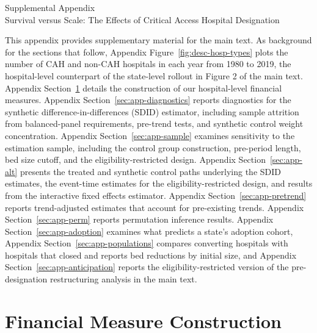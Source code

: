 \documentclass[a4paper, 12pt]{article}
\begin{document}
\onehalfspacing

\begin{center}
{\LARGE Supplemental Appendix} \\[0.5cm]
{\large Survival versus Scale: The Effects of Critical Access Hospital Designation}
\end{center}

\vspace{1cm}

This appendix provides supplementary material for the main text. As background for the sections that follow, Appendix Figure~\ref{fig:desc-hosp-types} plots the number of CAH and non-CAH hospitals in each year from 1980 to 2019, the hospital-level counterpart of the state-level rollout in Figure 2 of the main text. Appendix Section~\ref{sec:app-financial} details the construction of our hospital-level financial measures. Appendix Section~\ref{sec:app-diagnostics} reports diagnostics for the synthetic difference-in-differences (SDID) estimator, including sample attrition from balanced-panel requirements, pre-trend tests, and synthetic control weight concentration. Appendix Section~\ref{sec:app-sample} examines sensitivity to the estimation sample, including the control group construction, pre-period length, bed size cutoff, and the eligibility-restricted design. Appendix Section~\ref{sec:app-alt} presents the treated and synthetic control paths underlying the SDID estimates, the event-time estimates for the eligibility-restricted design, and results from the interactive fixed effects estimator. Appendix Section~\ref{sec:app-pretrend} reports trend-adjusted estimates that account for pre-existing trends. Appendix Section~\ref{sec:app-perm} reports permutation inference results. Appendix Section~\ref{sec:app-adoption} examines what predicts a state's adoption cohort, Appendix Section~\ref{sec:app-populations} compares converting hospitals with hospitals that closed and reports bed reductions by initial size, and Appendix Section~\ref{sec:app-anticipation} reports the eligibility-restricted version of the pre-designation restructuring analysis in the main text.



\section{Financial Measure Construction}
\label{sec:app-financial}
\end{document}

